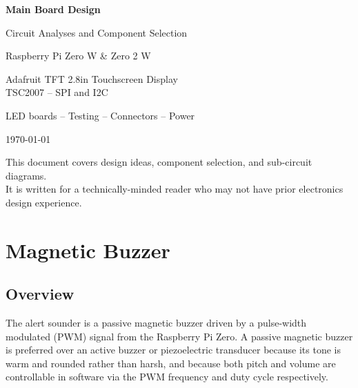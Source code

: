 \documentclass[12pt,letterpaper]{article}
\begin{document}
	
	\begin{titlepage}
		\centering
		\vspace*{2cm}
		{\Huge\bfseries\color{headblue} Main Board Design\par}
		\vspace{0.5cm}
		{\Large Circuit Analyses and Component Selection\par}
		\vspace{2cm}
		{\large Raspberry Pi Zero W \& Zero 2 W\par}
		\vspace{0.5cm}
		{\large Adafruit TFT 2.8in Touchscreen Display\\TSC2007 -- SPI and I2C\par}
		\vspace{0.5cm}
		{\large LED boards -- Testing -- Connectors -- Power\par}
		\vspace{3cm}
		{\normalsize\today\par}
		\vfill
		{\small This document covers design ideas, component selection, and sub-circuit diagrams.\\
			It is written for a technically-minded reader who may not have prior electronics design experience.}
	\end{titlepage}
	
	\tableofcontents
	
	
	
	
	
	\section{Magnetic Buzzer}
	
	\subsection{Overview}
	
	The alert sounder is a passive magnetic buzzer driven by a pulse-width modulated (PWM)
	signal from the Raspberry Pi Zero. A passive magnetic buzzer is preferred over an active
	buzzer or piezoelectric transducer because its tone is warm and rounded rather than harsh,
	and because both pitch and volume are controllable in software via the PWM frequency and
	duty cycle respectively.
	
\end{document}

